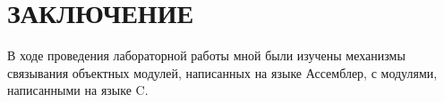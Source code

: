 \section*{ЗАКЛЮЧЕНИЕ}

В ходе проведения лабораторной работы мной были изучены механизмы связывания 
объектных модулей, написанных на языке Ассемблер, с модулями, 
написанными на языке C.

\pagebreak
